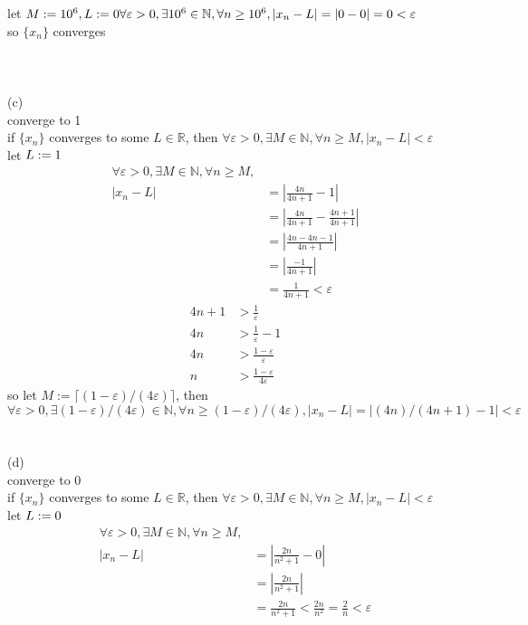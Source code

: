 \documentclass[12pt, border = 4pt, multi]{article} %
\begin{document}
let $M := 10 ^ 6,\\
L := 0\\
\forall \varepsilon > 0, \exists 10 ^ 6 \in \mathbb{N}, \forall n \geq 10 ^ 6, |x_n - L| = |0 - 0| = 0 < \varepsilon$\\
so $\{x_n\}$ converges\\
\\
\\
\\
(c)\\
converge to 1\\
if $\{x_n\}$ converges to some $L \in \mathbb{R}$, then $\forall \varepsilon > 0, \exists M \in \mathbb{N}, \forall n \geq M, |x_n - L| < \varepsilon$\\
let $L := 1\\$
\begin{align*}
\forall \varepsilon > 0, \exists M \in \mathbb{N}, \forall n \geq M,&\\
|x_n - L| &= \left|\frac{4n}{4n + 1} - 1\right|\\
&= \left|\frac{4n}{4n + 1} - \frac{4n + 1}{4n + 1}\right|\\
&= \left|\frac{4n - 4n - 1}{4n + 1}\right|\\
&= \left|\frac{-1}{4n + 1}\right|\\
&= \frac{1}{4n + 1} < \varepsilon
\end{align*}
\begin{align*}
4n + 1 &> \frac{1}{\varepsilon}\\
4n &> \frac{1}{\varepsilon} - 1\\
4n &> \frac{1 - \varepsilon}{\varepsilon}\\
n &> \frac{1 - \varepsilon}{4\varepsilon}
\end{align*}
so let $M := \lceil(1 - \varepsilon) / (4\varepsilon)\rceil$, then $\forall \varepsilon > 0, \exists (1 - \varepsilon) / (4\varepsilon) \in \mathbb{N}, \forall n \geq (1 - \varepsilon) / (4\varepsilon), |x_n - L| = |(4n) / (4n + 1) - 1| < \varepsilon$
\\
\\
\\
(d)\\
converge to 0\\
if $\{x_n\}$ converges to some $L \in \mathbb{R}$, then $\forall \varepsilon > 0, \exists M \in \mathbb{N}, \forall n \geq M, |x_n - L| < \varepsilon$\\
let $L := 0\\$
\begin{align*}
\forall \varepsilon > 0, \exists M \in \mathbb{N}, \forall n \geq M,&\\
|x_n - L| &= \left|\frac{2n}{n ^ 2 + 1} - 0\right|\\
&= \left|\frac{2n}{n ^ 2 + 1}\right|\\
&= \frac{2n}{n ^ 2 + 1} < \frac{2n}{n ^ 2} = \frac{2}{n} < \varepsilon
\end{align*}
\end{document}
